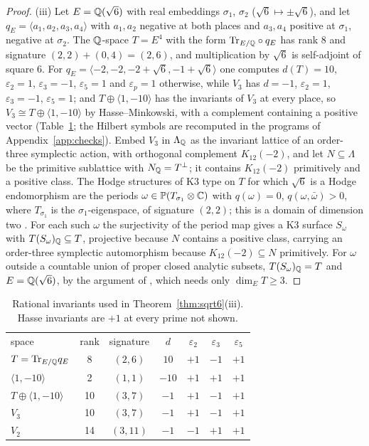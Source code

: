 \begin{proof}
(iii) Let $E=\mathbb{Q}(\sqrt6)$ with real embeddings $\sigma_{1}$, $\sigma_{2}$ ($\sqrt6\mapsto\pm\sqrt6$), and let $q_{E}=\langle a_{1},a_{2},a_{3},a_{4}\rangle$ with $a_{1},a_{2}$ negative at both places and $a_{3},a_{4}$ positive at $\sigma_{1}$, negative at $\sigma_{2}$. The $\mathbb{Q}$-space $T=E^{4}$ with the form $\mathrm{Tr}_{E/\mathbb{Q}}\circ q_{E}$ has rank $8$ and signature $(2,2)+(0,4)=(2,6)$, and multiplication by $\sqrt6$ is self-adjoint of square $6$. For $q_{E}=\langle-2,-2,-2+\sqrt6,-1+\sqrt6\rangle$ one computes $d(T)=10$, $\varepsilon_{2}=1$, $\varepsilon_{3}=-1$, $\varepsilon_{5}=1$ and $\varepsilon_{p}=1$ otherwise, while $V_{3}$ has $d=-1$, $\varepsilon_{2}=1$, $\varepsilon_{3}=-1$, $\varepsilon_{5}=1$; and $T\oplus\langle1,-10\rangle$ has the invariants of $V_{3}$ at every place, so $V_{3}\cong T\oplus\langle1,-10\rangle$ by Hasse--Minkowski, with a complement containing a positive vector (Table~\ref{tab:invariants}; the Hilbert symbols are recomputed in the programs of Appendix~\ref{app:checks}). Embed $V_{3}$ in $\Lambda_{\mathbb{Q}}$ as the invariant lattice of an order-three symplectic action, with orthogonal complement $K_{12}(-2)$, and let $N\subseteq\Lambda$ be the primitive sublattice with $N_{\mathbb{Q}}=T^{\perp}$; it contains $K_{12}(-2)$ primitively and a positive class. The Hodge structures of K3 type on $T$ for which $\sqrt6$ is a Hodge endomorphism are the periods $\omega\in\mathbb{P}(T_{\sigma_{1}}\otimes\mathbb{C})$ with $q(\omega)=0$, $q(\omega,\bar\omega)>0$, where $T_{\sigma_{1}}$ is the $\sigma_{1}$-eigenspace, of signature $(2,2)$; this is a domain of dimension two \cite[Prop.~2.3]{Var23}. For each such $\omega$ the surjectivity of the period map gives a K3 surface $S_{\omega}$ with $T(S_{\omega})_{\mathbb{Q}}\subseteq T$, projective because $N$ contains a positive class, carrying an order-three symplectic automorphism because $K_{12}(-2)\subseteq N$ primitively. For $\omega$ outside a countable union of proper closed analytic subsets, $T(S_{\omega})_{\mathbb{Q}}=T$ and $E=\mathbb{Q}(\sqrt6)$, by the argument of \cite[Thm.~22.9]{BMB26}, which needs only $\dim_{E}T\ge3$.
\end{proof}

\begin{table}[t]
\centering
\caption{Rational invariants used in Theorem~\ref{thm:sqrt6}(iii). Hasse invariants are $+1$ at every prime not shown.}
\label{tab:invariants}
\begin{ruledtabular}
\begin{tabular}{lcccccc}
space & rank & signature & $d$ & $\varepsilon_{2}$ & $\varepsilon_{3}$ & $\varepsilon_{5}$ \\
\colrule
$T=\mathrm{Tr}_{E/\mathbb{Q}}q_{E}$ & 8 & $(2,6)$ & $10$ & $+1$ & $-1$ & $+1$ \\
$\langle1,-10\rangle$ & 2 & $(1,1)$ & $-10$ & $+1$ & $+1$ & $+1$ \\
$T\oplus\langle1,-10\rangle$ & 10 & $(3,7)$ & $-1$ & $+1$ & $-1$ & $+1$ \\
$V_{3}$ & 10 & $(3,7)$ & $-1$ & $+1$ & $-1$ & $+1$ \\
$V_{2}$ & 14 & $(3,11)$ & $-1$ & $-1$ & $+1$ & $+1$ \\
\end{tabular}
\end{ruledtabular}
\end{table}

